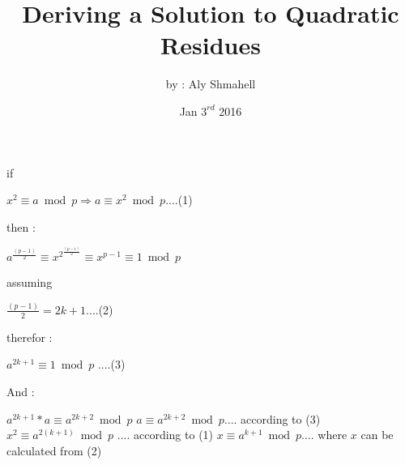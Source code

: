 \documentclass[12pt]{article}
\title{Deriving a Solution to Quadratic Residues}
\author{by : Aly Shmahell}
\date{Jan $ 3^{rd} $ 2016}
\begin{document}
\maketitle
\begin{large}
\begin{center}
if 
\end{center}
$ x^{2} \equiv a \bmod p \Rightarrow a \equiv x^{2} \bmod p $\space\space\space\space....(1) \newline
\begin{center}
then :
\end{center}
 $ a^{\frac{(p-1)}{2}} \equiv x^{2^{\frac{(p-1)}{2}}} \equiv x^{p-1} \equiv 1 \bmod p$ \newline
\begin{center}
assuming 
\end{center}
 $ \frac{(p-1)}{2} = 2k+1 $\space\space\space\space....(2) \newline
\begin{center}
therefor :
\end{center}
 $ a^{2k+1} \equiv 1 \bmod p $ \space\space\space\space....(3) \newline
\begin{center}
And :
\end{center}
$ a^{2k+1} * a \equiv a^{2k+2} \bmod p $ \newline\newline
$ a \equiv a^{2k+2} \bmod p $\space\space\space\space .... according to (3) \newline\newline
$ x^{2} \equiv a^{2(k+1)} \bmod p $ .... according to (1) \newline\newline
$ x \equiv a^{k+1} \bmod p $\space\space\space\space .... where $ x $ can be calculated from (2)
\end{large}
\end{document}
